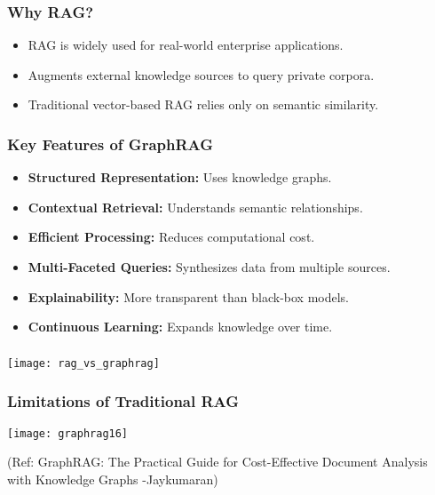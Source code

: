\begin{frame}[fragile]\frametitle{Why RAG?}
    \begin{itemize}
        \item RAG is widely used for real-world enterprise applications.
        \item Augments external knowledge sources to query private corpora.
        \item Traditional vector-based RAG relies only on semantic similarity.
    \end{itemize}
\end{frame}

\begin{frame}[fragile]\frametitle{Key Features of GraphRAG}
    \begin{itemize}
        \item \textbf{Structured Representation:} Uses knowledge graphs.
        \item \textbf{Contextual Retrieval:} Understands semantic relationships.
        \item \textbf{Efficient Processing:} Reduces computational cost.
        \item \textbf{Multi-Faceted Queries:} Synthesizes data from multiple sources.
        \item \textbf{Explainability:} More transparent than black-box models.
        \item \textbf{Continuous Learning:} Expands knowledge over time.
    \end{itemize}
\end{frame}

\begin{frame}[fragile]\frametitle{}

	\begin{center}
	\texttt{[image: rag\_vs\_graphrag]}
	\end{center}
	
\end{frame}


\begin{frame}[fragile]\frametitle{Limitations of Traditional RAG}
	
	\begin{center}
	\texttt{[image: graphrag16]}
	
	{\tiny (Ref: GraphRAG: The Practical Guide for Cost-Effective Document Analysis with Knowledge Graphs -Jaykumaran)}
	\end{center}	
\end{frame}

